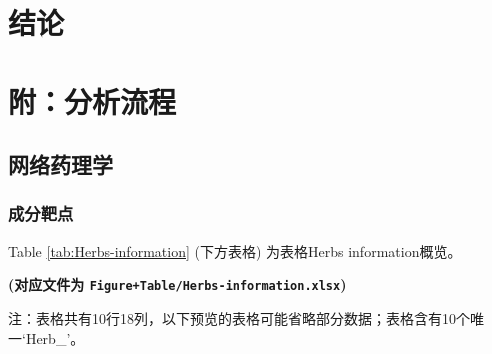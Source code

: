 \documentclass[
]{article}
\begin{document}
\hypertarget{dis}{%
\section{结论}\label{dis}}

\hypertarget{workflow}{%
\section{附：分析流程}\label{workflow}}

\hypertarget{ux7f51ux7edcux836fux7406ux5b66}{%
\subsection{网络药理学}\label{ux7f51ux7edcux836fux7406ux5b66}}

\hypertarget{ux6210ux5206ux9776ux70b9}{%
\subsubsection{成分靶点}\label{ux6210ux5206ux9776ux70b9}}

Table \ref{tab:Herbs-information} (下方表格) 为表格Herbs information概览。

\textbf{(对应文件为 \texttt{Figure+Table/Herbs-information.xlsx})}

\begin{center}\begin{tcolorbox}[colback=gray!10, colframe=gray!50, width=0.9\linewidth, arc=1mm, boxrule=0.5pt]注：表格共有10行18列，以下预览的表格可能省略部分数据；表格含有10个唯一`Herb\_'。
\end{tcolorbox}
\end{center}
\end{document}
